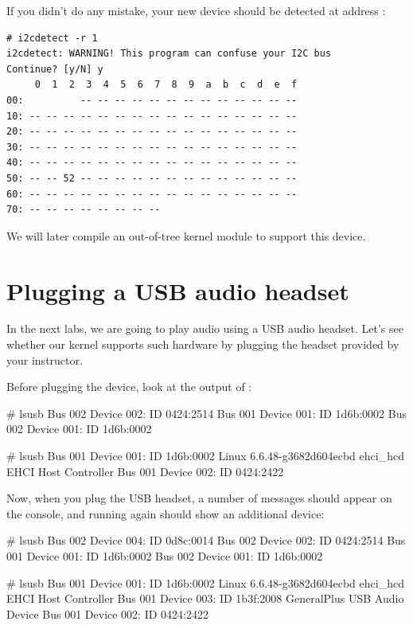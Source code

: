 If you didn't do any mistake, your new device should be detected at
address :

\begin{verbatim}
# i2cdetect -r 1
i2cdetect: WARNING! This program can confuse your I2C bus
Continue? [y/N] y
     0  1  2  3  4  5  6  7  8  9  a  b  c  d  e  f
00:          -- -- -- -- -- -- -- -- -- -- -- -- --
10: -- -- -- -- -- -- -- -- -- -- -- -- -- -- -- --
20: -- -- -- -- -- -- -- -- -- -- -- -- -- -- -- --
30: -- -- -- -- -- -- -- -- -- -- -- -- -- -- -- --
40: -- -- -- -- -- -- -- -- -- -- -- -- -- -- -- --
50: -- -- 52 -- -- -- -- -- -- -- -- -- -- -- -- --
60: -- -- -- -- -- -- -- -- -- -- -- -- -- -- -- --
70: -- -- -- -- -- -- -- --
\end{verbatim}

We will later compile an out-of-tree kernel module to support this device.

\section{Plugging a USB audio headset}

In the next labs, we are going to play audio using a USB audio headset.
Let's see whether our kernel supports such hardware by plugging the
headset provided by your instructor.

Before plugging the device, look at the output of :

\if{}
\begin{bashinput}
# lsusb
Bus 002 Device 002: ID 0424:2514
Bus 001 Device 001: ID 1d6b:0002
Bus 002 Device 001: ID 1d6b:0002
\end{bashinput}
\fi
\if{}
\begin{bashinput}
# lsusb
Bus 001 Device 001: ID 1d6b:0002 Linux 6.6.48-g3682d604ecbd ehci_hcd EHCI Host Controller
Bus 001 Device 002: ID 0424:2422
\end{bashinput}
\fi

Now, when you plug the USB headset, a number of messages should appear
on the console, and running  again should show an
additional device:

\if{}
\begin{bashinput}
# lsusb
Bus 002 Device 004: ID 0d8c:0014
Bus 002 Device 002: ID 0424:2514
Bus 001 Device 001: ID 1d6b:0002
Bus 002 Device 001: ID 1d6b:0002
\end{bashinput}
\fi
\if{}
\begin{bashinput}
# lsusb
Bus 001 Device 001: ID 1d6b:0002 Linux 6.6.48-g3682d604ecbd ehci_hcd EHCI Host Controller
Bus 001 Device 003: ID 1b3f:2008 GeneralPlus USB Audio Device
Bus 001 Device 002: ID 0424:2422
\end{bashinput}
\fi

